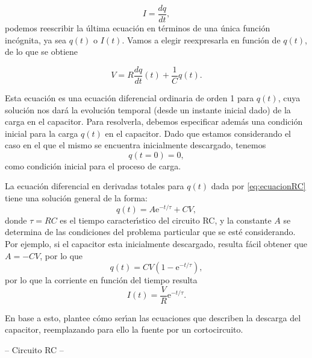 \documentclass[laboratorio]{guia}
\begin{document}
$$ I = \frac{dq}{dt}, $$
podemos reescribir la \'ultima ecuaci\'on en t\'erminos de una \'unica
funci\'on inc\'ognita, ya sea $q(t)$ o $I(t)$. Vamos a elegir reexpresarla en
funci\'on de $q(t)$, de lo que se obtiene

\begin{equation}
    V = R \frac{dq}{dt}(t) + \frac{1}{C} q(t).
    \label{eq:ecuacionRC}
\end{equation}

Esta ecuaci\'on es una ecuaci\'on diferencial ordinaria de orden 1 para $q(t)$, 
cuya soluci\'on nos dar\'a la evoluci\'on temporal (desde un instante inicial
dado) de la carga en el capacitor. 
Para resolverla, debemos especificar adem\'as una condici\'on inicial para la 
carga $q(t)$ en el capacitor. Dado que estamos considerando el caso en el que
el mismo se encuentra inicialmente descargado, tenemos
\begin{equation}
    q(t=0) = 0,
\end{equation}
como condici\'on inicial para el proceso de carga. 

La ecuaci\'on diferencial en derivadas totales para $q(t)$ dada por
\eqref{eq:ecuacionRC} tiene una soluci\'on general de la forma:
\begin{equation}
    q(t) = A \text{e}^{-t/\tau} + CV,
\end{equation}
donde $\tau = RC$ es el tiempo caracter\'\i stico del circuito RC, y la
constante $A$ se determina de las condiciones del problema particular que se
est\'e considerando. Por ejemplo, si el capacitor esta inicialmente descargado,
resulta f\'acil obtener que $A = -CV$, por lo que
\begin{equation*}
    q(t) = CV \left(1 - \text{e}^{-t/\tau} \right),
\end{equation*}
por lo que la corriente en funci\'on del tiempo resulta
\begin{equation*}
    I(t) = \frac{V}{R} \text{e}^{-t/\tau}.
\end{equation*}

En base a esto, plantee c\'omo ser\'\i an las ecuaciones que describen la
descarga del capacitor, reemplazando para ello la fuente por un cortocircuito.


        -- Circuito RC -- %
\end{document}
